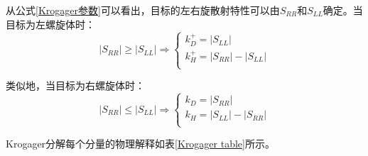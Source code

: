 \documentclass[promaster]{thesis-uestc}
\begin{document}
从公式\ref{Krogager参数}可以看出，目标的左右旋散射特性可以由$S_{RR}$和$S_{LL}$确定。当目标为左螺旋体时：
\begin{equation}
    \left| S_{RR} \right|\geqslant \left| S_{LL} \right|\Rightarrow \left\{ \begin{array}{c}
        k_{D}^{+}=\left| S_{LL} \right|                       \\
        k_{H}^{+}=\left| S_{RR} \right|-\left| S_{LL} \right| \\
    \end{array} \right.
\end{equation}

类似地，当目标为右螺旋体时：
\begin{equation}
    \left| S_{RR} \right|\leqslant \left| S_{LL} \right|\Rightarrow \left\{ \begin{array}{c}
        k_D=\left| S_{RR} \right|                       \\
        k_H=\left| S_{LL} \right|-\left| S_{RR} \right| \\
    \end{array} \right.
\end{equation}

Krogager分解每个分量的物理解释如表\ref{Krogager table}所示。
\begin{table}[h]
    \caption{Krogager分解}
    \label{Krogager table}
\end{table}
\end{document}
